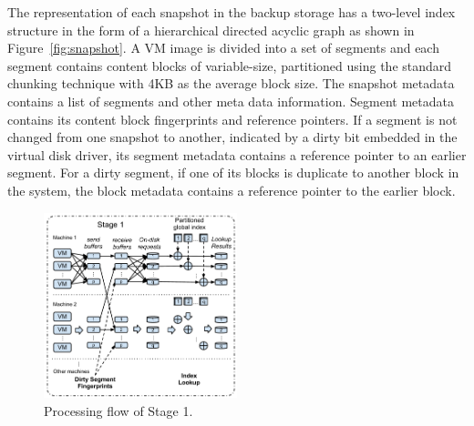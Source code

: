The representation of each snapshot in the backup storage
has a two-level index structure in the form of a hierarchical
directed acyclic graph as shown in Figure~\ref{fig:snapshot}.
A VM image is divided into a set of segments and each  segment contains 
content blocks of variable-size, partitioned using
the standard chunking technique with 4KB as the average block size. 
The snapshot metadata  contains a list of segments and other meta data information.
Segment metadata  contains its  content block fingerprints and reference pointers. 
If a segment is not changed from one snapshot to another, indicated by a dirty bit embedded in the virtual disk driver, 
its segment metadata contains a reference pointer to an earlier segment.
For a dirty segment, if one of its blocks is duplicate to another block in the system,  
the block metadata contains a reference pointer to the earlier block.






\begin{figure}[th]
\centering
\includegraphics[width=0.5\textwidth]{images/Stage1.pdf}
\caption{Processing flow of Stage 1.}
\label{fig:stage1}
\end{figure}

